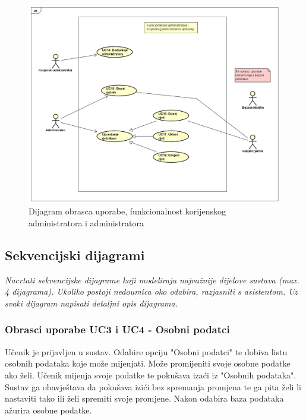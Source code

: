 					\begin{figure}[H]
						\includegraphics[width=\textwidth]{dijagrami/ucdiag2.png} %
						\caption{Dijagram obrasca uporabe, funkcionalnost korijenskog administratora i administratora}
						\label{fig:ucdiag2} %
					\end{figure}

				\eject		
				
			\subsection{Sekvencijski dijagrami}
				
				\textit{Nacrtati sekvencijske dijagrame koji modeliraju najvažnije dijelove sustava (max. 4 dijagrama). Ukoliko postoji nedoumica oko odabira, razjasniti s asistentom. Uz svaki dijagram napisati detaljni opis dijagrama.}
				
				\subsubsection{Obrasci uporabe UC3 i UC4 - Osobni podatci}
                    Učenik je prijavljen u sustav. Odabire opciju "Osobni podatci" te dobiva listu osobnih podataka koje može mijenjati.
                    Može promijeniti svoje osobne podatke ako želi. Učenik mijenja svoje podatke te pokušava izaći iz "Osobnih podataka".
                    Sustav ga obavještava da pokušava izići bez spremanja promjena te ga pita želi li nastaviti tako ili želi spremiti svoje promjene.
                    Nakon odabira baza podataka ažurira osobne podatke.

